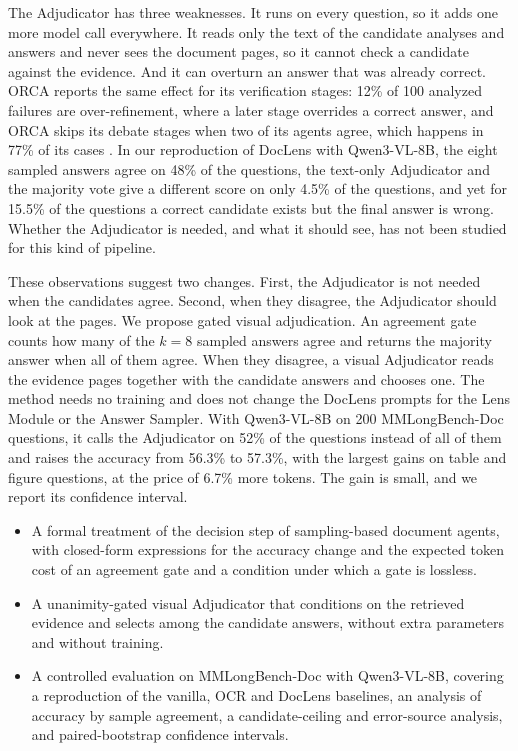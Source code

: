\documentclass[pdflatex,sn-basic]{sn-jnl}%
\theoremstyle{thmstyletwo}%
\begin{document}
The Adjudicator has three weaknesses. It runs on every question, so it adds one more model call everywhere. It reads only the text of the candidate analyses and answers and never sees the document pages, so it cannot check a candidate against the evidence. And it can overturn an answer that was already correct. ORCA reports the same effect for its verification stages: 12\% of 100 analyzed failures are over-refinement, where a later stage overrides a correct answer, and ORCA skips its debate stages when two of its agents agree, which happens in 77\% of its cases \cite{orca}. In our reproduction of DocLens with Qwen3-VL-8B, the eight sampled answers agree on 48\% of the questions, the text-only Adjudicator and the majority vote give a different score on only 4.5\% of the questions, and yet for 15.5\% of the questions a correct candidate exists but the final answer is wrong. Whether the Adjudicator is needed, and what it should see, has not been studied for this kind of pipeline.

These observations suggest two changes. First, the Adjudicator is not needed when the candidates agree. Second, when they disagree, the Adjudicator should look at the pages. We propose gated visual adjudication. An agreement gate counts how many of the $k=8$ sampled answers agree and returns the majority answer when all of them agree. When they disagree, a visual Adjudicator reads the evidence pages together with the candidate answers and chooses one. The method needs no training and does not change the DocLens prompts for the Lens Module or the Answer Sampler. With Qwen3-VL-8B on 200 MMLongBench-Doc questions, it calls the Adjudicator on 52\% of the questions instead of all of them and raises the accuracy from 56.3\% to 57.3\%, with the largest gains on table and figure questions, at the price of 6.7\% more tokens. The gain is small, and we report its confidence interval.

\begin{itemize}
  \item A formal treatment of the decision step of sampling-based document agents, with closed-form expressions for the accuracy change and the expected token cost of an agreement gate and a condition under which a gate is lossless.
  \item A unanimity-gated visual Adjudicator that conditions on the retrieved evidence and selects among the candidate answers, without extra parameters and without training.
  \item A controlled evaluation on MMLongBench-Doc with Qwen3-VL-8B, covering a reproduction of the vanilla, OCR and DocLens baselines, an analysis of accuracy by sample agreement, a candidate-ceiling and error-source analysis, and paired-bootstrap confidence intervals.
\end{itemize}
\end{document}
